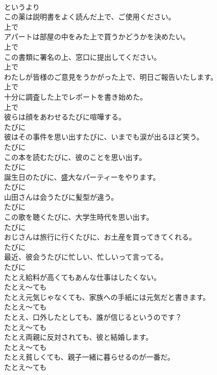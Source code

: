 \documentclass[8pt]{extreport}
\begin{document}
\begin{CJK}{UTF8}{min}
\\	というより	
\\	この薬は説明書をよく読んだ上で、ご使用ください。	
\\	上で	
\\	アパートは部屋の中をみた上で買うかどうかを決めたい。	
\\	上で	
\\	この書類に署名の上、窓口に提出してください。	
\\	上で	
\\	わたしが皆様のご意見をうかがった上で、明日ご報告いたします。	
\\	上で	
\\	十分に調査した上でレポートを書き始めた。	
\\	上で	
\\	彼らは顔をあわせるたびに喧嘩する。	
\\	たびに	
\\	彼はその事件を思い出すたびに、いまでも涙が出るほど笑う。	
\\	たびに	
\\	この本を読むたびに、彼のことを思い出す。	
\\	たびに	
\\	誕生日のたびに、盛大なパーティーをやります。	
\\	たびに	
\\	山田さんは会うたびに髪型が違う。	
\\	たびに	
\\	この歌を聴くたびに、大学生時代を思い出す。	
\\	たびに	
\\	おじさんは旅行に行くたびに、お土産を買ってきてくれる。	
\\	たびに	
\\	最近、彼会うたびに忙しい、忙しいって言ってる。	
\\	たびに	
\\	たとえ給料が高くてもあんな仕事はしたくない。	
\\	たとえ～ても	
\\	たとえ元気じゃなくても、家族への手紙には元気だと書きます。	
\\	たとえ～ても	
\\	たとえ、口外したとしても、誰が信じるというのです？	
\\	たとえ～ても	
\\	たとえ両親に反対されても、彼と結婚します。	
\\	たとえ～ても	
\\	たとえ貧しくても、親子一緒に暮らせるのが一番だ。	
\\	たとえ～ても	

\end{CJK}
\end{document}
